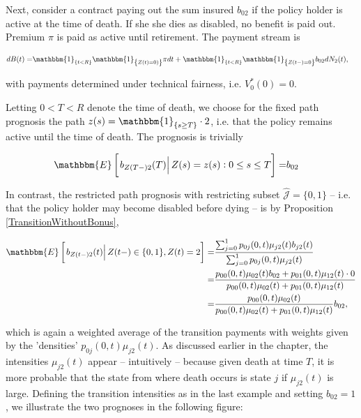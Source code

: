 \documentclass{book}
\newcommand{\1}[1]{\mathbbm{1}_{\left\lbrace #1 \right\rbrace}}
\newcommand{\econd}[2][def]{\mathbbm{E} \left[ \left. #1 \right| #2 \right]}
\theoremstyle{break}
\theoremstyle{remark}
\numberwithin{equation}{section}
\begin{document}
Next, consider a contract paying out the sum insured $b_{02}$ if the policy holder is active at the time of death. If she she dies as disabled, no benefit is paid out. Premium $\pi$ is paid as active until retirement. The payment stream is

\begin{align*}
	dB(t) =& \1{t<R} \1{Z(t)=0)} \pi dt + \1{t<R} \1{Z(t-)=0} b_{02} d N_2(t),
\end{align*}

with payments determined under technical fairness, i.e. $V_0^*(0)=0$.

Letting $0<T<R$ denote the time of death, we choose for the fixed path prognosis the path $z(s) = \1{s \geq T} \cdot 2$, i.e. that the policy remains active until the time of death. The prognosis is trivially

\begin{align} \label{Fixed2}
	\econd[b_{Z(T-)2}(T)]{ Z(s) = z(s) : 0 \leq s \leq T} =& b_{02}
\end{align}

In contrast, the restricted path prognosis with restricting subset $\hat{\mathcal{J}} = \{ 0,1 \}$ -- i.e. that the policy holder may become disabled before dying -- is by Proposition \ref{TransitionWithoutBonus},

\begin{align} \label{Restricted2}
\begin{split}
	\econd[b_{Z(t-)2}(t)]{Z(t-) \in \{ 0,1 \}, Z(t)=2} =& \frac{\sum_{j=0}^1 p_{0j}(0,t) \mu_{j2}(t) b_{j2}(t)}{\sum_{j=0}^1 p_{0j}(0,t) \mu_{j2}(t)} \\
	=&\frac{p_{00}(0,t) \mu_{02}(t) b_{02} + p_{01}(0,t) \mu_{12}(t) \cdot 0}{p_{00}(0,t) \mu_{02}(t) + p_{01}(0,t) \mu_{12}(t)} \\
	=&\frac{p_{00}(0,t) \mu_{02}(t)}{p_{00}(0,t) \mu_{02}(t) + p_{01}(0,t) \mu_{12}(t)} b_{02},
\end{split}
\end{align}

which is again a weighted average of the transition payments with weights given by the 'densities' $p_{0j}(0,t) \mu_{j2}(t)$. As discussed earlier in the chapter, the intensities $\mu_{j2}(t)$ appear -- intuitively -- because given death at time $T$, it is more probable that the state from where death occurs is state $j$ if $\mu_{j2}(t)$ is large. Defining the transition intensities as in the last example and setting $b_{02} = 1$, we illustrate the two prognoses in the following figure:
\end{document}
